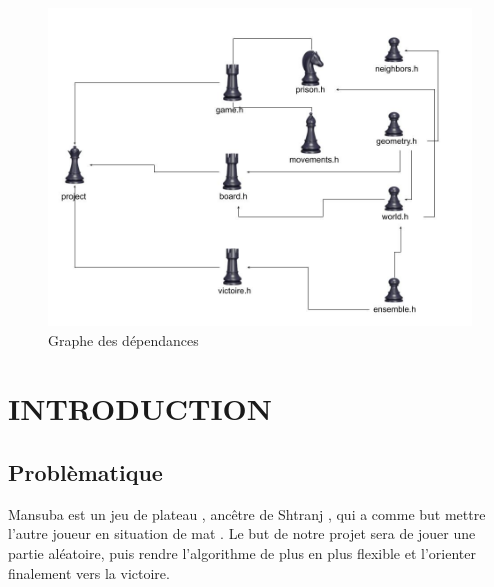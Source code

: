 \documentclass[a4paper]{article}
\begin{document}
\author{Réalisé par:\\MOHAMMED BOUHAJA ET AMIRA ELOUAZZANI \\\textbf{Encadré par: Julien Allali}}
\date{}
\maketitle





\newpage

\tableofcontents

\newpage



\begin{figure}
  \includegraphics[width=\linewidth]{Dessin sans titre.jpg}
  \caption{Graphe des dépendances}
  \label{fig:length_eight_mouse}
\end{figure}
  


\section{INTRODUCTION}
\subsection{Problèmatique}
Mansuba est un jeu de plateau , ancêtre de Shtranj , qui a comme but mettre l’autre joueur en situation de mat . 
Le but de notre projet sera de jouer une partie aléatoire, puis rendre l'algorithme de plus en plus flexible
et l'orienter finalement vers la victoire. 
\end{document}
